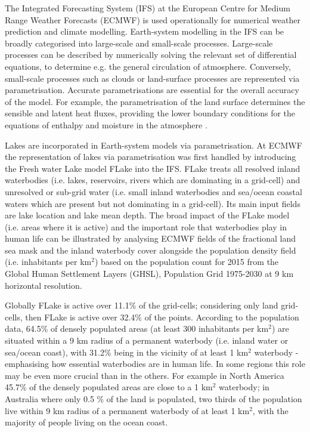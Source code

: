 \documentclass[hess, twostagejnl]{copernicus}
\begin{document}
\noindent The Integrated Forecasting System (IFS) at the European Centre for Medium Range Weather Forecasts (ECMWF) is used operationally for numerical weather prediction and climate modelling. Earth-system modelling in the IFS can be broadly categorised into large-scale and small-scale processes. Large-scale processes can be described by numerically solving the relevant set of differential equations, to determine e.g. the general circulation of atmosphere. Conversely, small-scale processes such as clouds or land-surface processes are represented via parametrisation. Accurate parametrisations are essential for the overall accuracy of the model. For example, the parametrisation of the land surface determines the sensible and latent heat fluxes, providing the lower boundary conditions for the equations of enthalpy and moisture in the atmosphere \citep{p16960}. \newline 

\noindent Lakes are incorporated in Earth-system models via parametrisation. At ECMWF the  representation of lakes via parametrisation was first handled by introducing the Fresh water Lake model FLake \citep{Mironov2008} into the IFS. FLake treats all resolved inland waterbodies (i.e. lakes, reservoirs, rivers which are dominating in a grid-cell) and unresolved or sub-grid water (i.e. small inland waterbodies and sea/ocean coastal waters which are present but not dominating in a grid-cell). Its main input fields are lake location and lake mean depth. The broad impact of the FLake model (i.e. areas where it is active) and the important role that waterbodies play in human life can be illustrated by analysing ECMWF fields of the fractional land sea mask and the inland waterbody cover alongside the population density field (i.e. inhabitants per km$^2$) based on the population count for 2015 from the Global Human Settlement Layers (GHSL), Population Grid 1975-2030 \citep{JRC100523,GHS} at 9 km horizontal resolution. 

%

Globally FLake is active over 11.1\% of the grid-cells; considering only land grid-cells, then FLake is active over 32.4\% of the points. According to the population data, 64.5\% of densely populated areas (at least 300 inhabitants per km$^2$) are situated within a 9 km radius of a permanent waterbody (i.e. inland water or sea/ocean coast), with 31.2\% being in the vicinity of at least 1 km$^2$ waterbody - emphasising how essential waterbodies are in human life. In some regions this role may be even more crucial than in the others. For example in North America 45.7\% of the densely populated areas are close to a 1 km$^2$ waterbody; in Australia where only 0.5 \% of the land is populated,  two thirds of the population live within 9 km radius of a permanent waterbody of at least 1 km$^2$, with the majority of people living on the ocean coast. \newline 
\end{document}
